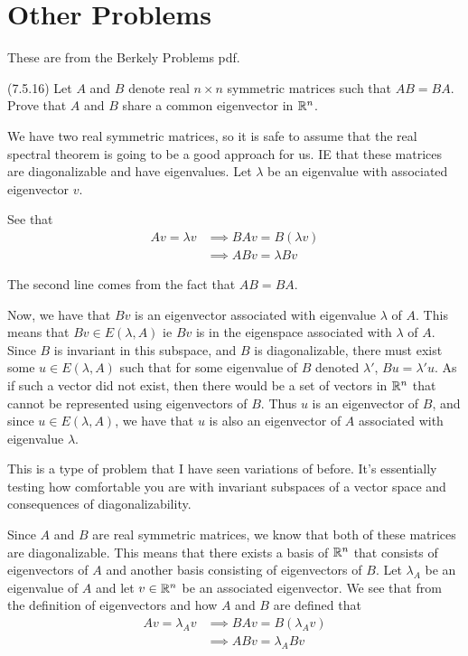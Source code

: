\documentclass[answers]{exam}
\begin{document}
\section{Other Problems}
These are from the Berkely Problems pdf.
\begin{questions}
    \question (7.5.16) Let $A$ and $B$ denote real $n\times n$ symmetric matrices such that $AB=BA$.
    Prove that $A$ and $B$ share a common eigenvector in $\mathbb{R}^n$.
    \begin{solution}

         We have two real symmetric matrices, so it is safe to assume that the real spectral
        theorem is going to be a good approach for us. IE that these matrices are diagonalizable and have 
        eigenvalues. Let $\lambda$ be an eigenvalue with associated eigenvector $v$.

        See that 
        \begin{align*}
            Av = \lambda v &\implies BAv = B(\lambda v) \\
            &\implies ABv = \lambda Bv
        \end{align*}

        The second line comes from the fact that $AB=BA$.

        Now, we have that $Bv$ is an eigenvector associated with eigenvalue $\lambda$ of $A$. This means that
        $Bv\in E(\lambda,A)$ ie $Bv$ is in the eigenspace associated with $\lambda$ of $A$. Since $B$ is 
        invariant in this subspace, and $B$ is diagonalizable, there must exist some $u\in E(\lambda,A)$ such that
        for some eigenvalue of $B$ denoted $\lambda'$, $Bu = \lambda'u$. As if such a vector did not exist, then
        there would be a set of vectors in $\mathbb{R}^n$ that cannot be represented using eigenvectors of $B$. Thus $u$
        is an eigenvector of $B$, and since $u\in E(\lambda,A)$, we have that $u$ is also an eigenvector of $A$
        associated with eigenvalue $\lambda$.

         This is a type of problem that I have seen variations of before. It's essentially testing
        how comfortable you are with invariant subspaces of a vector space and consequences of diagonalizability.

        Since $A$ and $B$ are real symmetric matrices, we know that both of these matrices are diagonalizable. 
        This means that there exists a basis of $\mathbb{R}^n$ that consists of eigenvectors of $A$ and another basis
        consisting of eigenvectors of $B$. Let $\lambda_A$ be an eigenvalue of $A$ and let $v\in\mathbb{R}^n$ be an 
        associated eigenvector. We see that from the definition of eigenvectors and how $A$ and $B$ are defined
        that
        \begin{align*}
            Av = \lambda_A v &\implies BAv = B(\lambda_A v) \\
            &\implies ABv = \lambda_A Bv
        \end{align*}


\end{solution}
\end{questions}
\end{document}
